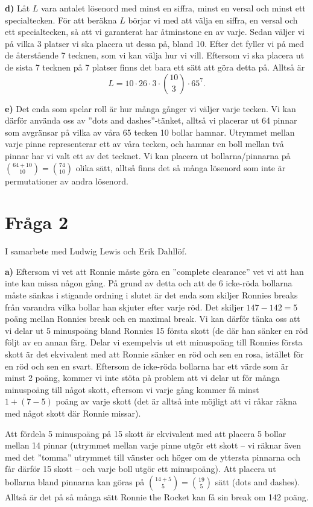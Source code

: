 \documentclass{article}
\begin{document}
\textbf{d)}
Låt $L$ vara antalet lösenord med minst en siffra, minst en versal och minst ett specialtecken. För att beräkna $L$ börjar vi med att välja en siffra, en versal och ett specialtecken, så att vi garanterat har åtminstone en av varje. Sedan väljer vi på vilka 3 platser vi ska placera ut dessa på, bland 10. Efter det fyller vi på med de återstående 7 tecknen, som vi kan välja hur vi vill. Eftersom vi ska placera ut de sista 7 tecknen på 7 platser finns det bara ett sätt att göra detta på. Alltså är
 \[
	 L = 10 \cdot 26 \cdot 3 \cdot {10 \choose 3} \cdot 65^{7}
.\] 

\textbf{e)}
Det enda som spelar roll är hur många gånger vi väljer varje tecken. Vi kan därför använda oss av ''dots and dashes''-tänket, alltså vi placerar ut 64 pinnar som avgränsar på vilka av våra 65 tecken 10 bollar hamnar. Utrymmet mellan varje pinne representerar ett av våra tecken, och hamnar en boll mellan två pinnar har vi valt ett av det tecknet. Vi kan placera ut bollarna/pinnarna på ${64 + 10 \choose 10} = {74 \choose 10}$ olika sätt, alltså finns det så många lösenord som inte är permutationer av andra lösenord.


\section{Fråga 2}
I samarbete med Ludwig Lewis och Erik Dahllöf.

\textbf{a)}
Eftersom vi vet att Ronnie måste göra en ''complete clearance'' vet vi att han inte kan missa någon gång. På grund av detta och att de 6 icke-röda bollarna måste sänkas i stigande ordning i slutet är det enda som skiljer Ronnies breaks från varandra vilka bollar han skjuter efter varje röd. Det skiljer $147 - 142 = 5$ poäng mellan Ronnies break och en maximal break. Vi kan därför tänka oss att vi delar ut 5 minuspoäng bland Ronnies 15 första skott (de där han sänker en röd följt av en annan färg. Delar vi exempelvis ut ett minuspoäng till Ronnies första skott är det ekvivalent med att Ronnie sänker en röd och sen en rosa, istället för en röd och sen en svart. Eftersom de icke-röda bollarna har ett värde som är minst 2 poäng, kommer vi inte stöta på problem att vi delar ut för många minuspoäng till något skott, eftersom vi varje gång kommer få minst $1 + \left( 7 - 5 \right) $ poäng av varje skott (det är alltså inte möjligt att vi råkar räkna med något skott där Ronnie missar).

Att fördela 5 minuspoäng på 15 skott är ekvivalent med att placera 5 bollar mellan 14 pinnar (utrymmet mellan varje pinne utgör ett skott -- vi räknar även med det ''tomma'' utrymmet till vänster och höger om de yttersta pinnarna och får därför 15 skott -- och varje boll utgör ett minuspoäng). Att placera ut bollarna bland pinnarna kan göras på ${14 + 5 \choose 5} = {19 \choose 5}$ sätt (dots and dashes). Alltså är det på så många sätt Ronnie the Rocket kan få sin break om 142 poäng.
\end{document}

